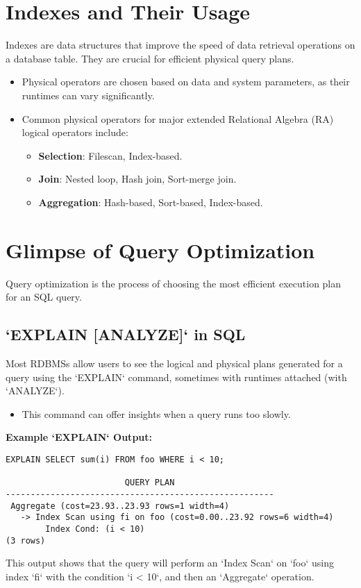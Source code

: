 \documentclass{article}
\begin{document}
\section*{Indexes and Their Usage}
Indexes are data structures that improve the speed of data retrieval operations on a database table. They are crucial for efficient physical query plans.
\begin{itemize}
    \item Physical operators are chosen based on data and system parameters, as their runtimes can vary significantly.
    \item Common physical operators for major extended Relational Algebra (RA) logical operators include:
        \begin{itemize}
            \item \textbf{Selection}: Filescan, Index-based.
            \item \textbf{Join}: Nested loop, Hash join, Sort-merge join.
            \item \textbf{Aggregation}: Hash-based, Sort-based, Index-based.
        \end{itemize}
\end{itemize}

\section*{Glimpse of Query Optimization}
Query optimization is the process of choosing the most efficient execution plan for an SQL query.

\subsection*{`EXPLAIN [ANALYZE]` in SQL}
Most RDBMSs allow users to see the logical and physical plans generated for a query using the `EXPLAIN` command, sometimes with runtimes attached (with `ANALYZE`).
\begin{itemize}
    \item This command can offer insights when a query runs too slowly.
\end{itemize}

\textbf{Example `EXPLAIN` Output:} 
\begin{lstlisting}
EXPLAIN SELECT sum(i) FROM foo WHERE i < 10;

                        QUERY PLAN
------------------------------------------------------
 Aggregate (cost=23.93..23.93 rows=1 width=4)
   -> Index Scan using fi on foo (cost=0.00..23.92 rows=6 width=4)
        Index Cond: (i < 10)
(3 rows)
\end{lstlisting}
This output shows that the query will perform an `Index Scan` on `foo` using index `fi` with the condition `i < 10`, and then an `Aggregate` operation. 
\end{document}
